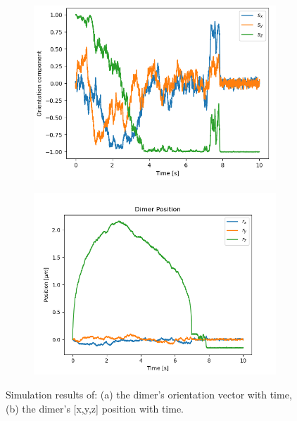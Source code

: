 \documentclass[final,  3p]{elsarticle}
\begin{document}
\begin{figure}[h]
	\centering
	\begin{subfigure}{0.45\textwidth}
		\subcaption{}
		\includegraphics[width =\textwidth]{./Images/fig5a.png}
	\end{subfigure}
	\begin{subfigure}{0.45\textwidth}
		\subcaption{}
		\includegraphics[width=\textwidth]{./Images/fig5b.png}
	\end{subfigure}
	\caption{Simulation results of: (a) the dimer's orientation vector with time, (b) the dimer's [x,y,z] position with time.}
	\label{fig:motion}
\end{figure}
\end{document}
